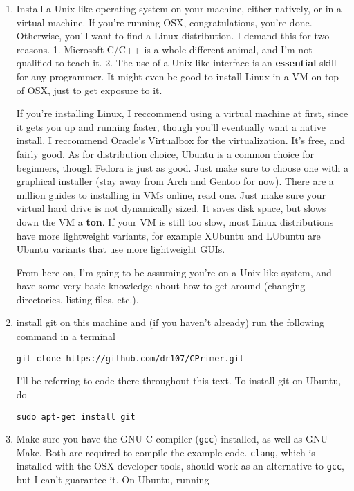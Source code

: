 \documentclass[ebook,11pt,oneside,openany]{memoir}
\begin{document}
\begin{enumerate}
\item Install a Unix-like operating system on your machine, either natively, or in a virtual machine. If you're running OSX, congratulations, you're done. Otherwise, you'll want to find a Linux distribution. I demand this for two reasons. 1. Microsoft C/C++ is a whole different animal, and I'm not qualified to teach it. 2. The use of a Unix-like interface is an \textbf{essential} skill for any programmer. It might even be good to install Linux in a VM on top of OSX, just to get exposure to it.

If you're installing Linux, I reccommend using a virtual machine at first, since it gets you up and running faster, though you'll eventually want a native install. I reccommend Oracle's Virtualbox for the virtualization. It's free, and fairly good. As for distribution choice, Ubuntu is a common choice for beginners, though Fedora is just as good. Just make sure to choose one with a graphical installer (stay away from Arch and Gentoo for now). There are a million guides to installing in VMs online, read one. Just make sure your virtual hard drive is not dynamically sized. It saves disk space, but slows down the VM a \textbf{ton}. If your VM is still too slow, most Linux distributions have more lightweight variants, for example XUbuntu and LUbuntu are Ubuntu variants that use more lightweight GUIs.

From here on, I'm going to be assuming you're on a Unix-like system, and have some very basic knowledge about how to get around (changing directories, listing files, etc.).

\item install git on this machine and (if you haven't already) run the following command in a terminal
\begin{verbatim}
git clone https://github.com/dr107/CPrimer.git 
\end{verbatim}

I'll be referring to code there throughout this text. To install git on Ubuntu, do

\begin{verbatim}
sudo apt-get install git
\end{verbatim}

\item Make sure you have the GNU C compiler (\texttt{gcc}) installed, as well as GNU Make. Both are required to compile the example code. \texttt{clang}, which is installed with the OSX developer tools, should work as an alternative to \texttt{gcc}, but I can't guarantee it. On Ubuntu, running 


\end{enumerate}
\end{document}
